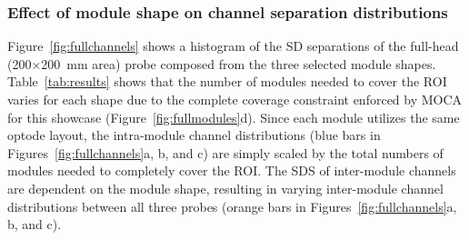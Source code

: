 \subsubsection{Effect of module shape on channel separation distributions}
Figure~\ref{fig:fullchannels} shows a histogram of the \ac{SD} separations of the full-head (200$\times$200~mm area) probe composed from the three selected module shapes. Table~\ref{tab:results} shows that the number of modules needed to cover the \ac{ROI} varies for each shape due to the complete coverage constraint enforced by \ac{MOCA} for this showcase (Figure~\ref{fig:fullmodules}d). Since each module utilizes the same optode layout, the intra-module channel distributions (blue bars in Figures~\ref{fig:fullchannels}a, b, and c) are simply scaled by the total numbers of modules needed to completely cover the \ac{ROI}. The \ac{SDS} of inter-module channels are dependent on the module shape, resulting in varying inter-module channel distributions between all three probes (orange bars in Figures~\ref{fig:fullchannels}a, b, and c). 

